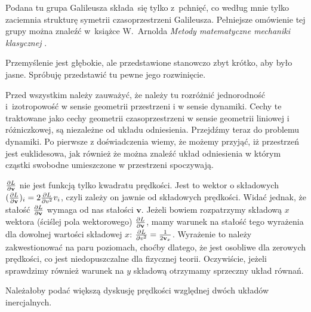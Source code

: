 \documentclass[a4paper,11pt]{article}
\numberwithin{equation}{section}
\begin{document}
\vspace{0em}


\noindent
{} Podana tu grupa Galileusza składa~się tylko z~pchnięć,
co według mnie tylko zaciemnia strukturę symetrii czasoprzestrzeni
Galileusza. Pełniejsze omówienie tej grupy można znaleźć w~książce
W.~Arnolda \textit{Metody matematyczne mechaniki klasycznej}
\cite{ArnoldMetodyMatematyczneMechanikiKlasycznej1981}.

\VerSpaceFour





\noindent
{} Przemyślenie jest głębokie, ale przedstawione
stanowczo zbyt krótko, aby było jasne. Spróbuję przedstawić tu pewne
jego rozwinięcie.

Przed wszystkim należy zauważyć, że należy tu rozróżnić jednorodność
i~izotropowość w sensie geometrii przestrzeni i w sensie dynamiki.
Cechy te traktowane jako cechy geometrii czasoprzestrzeni w sensie
geometrii liniowej i różniczkowej, są niezależne od układu
odniesienia. Przejdźmy teraz do problemu dynamiki. Po pierwsze z
doświadczenia wiemy, że możemy przyjąć, iż przestrzeń jest
euklidesowa, jak również że można znaleźć układ odniesienia w którym
cząstki swobodne umieszczone w przestrzeni spoczywają.

\VerSpaceFour





\noindent
{} $\frac{ \partial L }{ \partial \mathbf{v} }$ nie jest
funkcją tylko kwadratu prędkości. Jest to wektor o składowych
$( \frac{ \partial L }{ \partial \mathbf{v} } )_{ i }
= 2 \frac{ \partial L }{ \partial { v^{ 2 } } } v_{ i }$, czyli zależy on
jawnie od składowych prędkości. Widać jednak, że stałość
$\frac{ \partial L }{ \partial \mathbf{v} }$ wymaga od nas stałości
$\mathbf{ v }$. Jeżeli bowiem rozpatrzymy składową $x$ wektora
(ściślej pola wektorowego)
$\frac{ \partial L }{ \partial \mathbf{v} }$, mamy warunek na stałość
tego wyrażenia dla dowolnej wartości składowej $x$:
$\frac{ \partial L }{ \partial { v^{ 2 } } } = \frac{ 1 }{ 2 \mathbf{v}_{ x } }$.
Wyrażenie to należy zakwestionować na paru
poziomach, choćby dlatego, że jest osobliwe dla zerowych prędkości, co
jest niedopuszczalne dla fizycznej teorii. Oczywiście, jeżeli sprawdzimy
również warunek na $y$ składową otrzymamy sprzeczny układ równań.

\VerSpaceFour





\noindent
{} Należałoby podać większą dyskusję prędkości względnej dwóch
układów inercjalnych.
\end{document}
